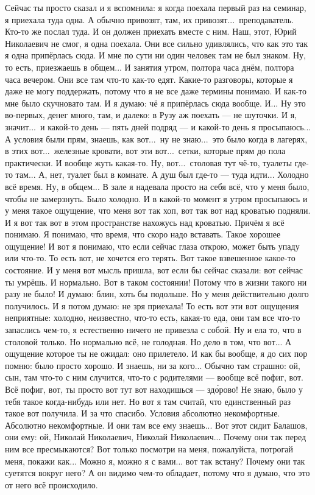 \M
Сейчас ты просто сказал и я вспомнила: я когда поехала первый раз на семинар,
я приехала туда одна. А обычно привозят, там, их привозят...\
преподаватель. Кто-то же послал туда. И он должен приехать вместе с ним. Наш, этот,
Юрий Николаевич не смог, я одна поехала. Они все сильно удивлялись, что как это
так я одна припёрлась сюда.
И мне по сути ни один человек там не был знаком. Ну, то есть, приезжаешь в общем...
И занятия утром, полтора часа днём, полтора часа вечером. Они все там что-то как-то едят.
Какие-то разговоры, которые я даже не могу поддержать, потому что я не все даже термины понимаю.
И как-то мне было скучновато там. И я думаю: чё я припёрлась сюда вообще. И...
Ну это во-первых, денег много, там, и далеко: в Рузу аж поехать --- не шуточки.
И я, значит...\ и какой-то день --- пять дней подряд --- и какой-то день я просыпаюсь...
А условия были прям, знаешь, как вот...\ ну не знаю...\ это было когда в лагерях,
в этих вот...\ железные кровати, вот эти вот...\ сетки, которые прям до пола практически.
И вообще жуть какая-то.
Ну, вот...\ столовая тут чё-то, туалеты где-то там...
А, нет, туалет был в комнате.
А душ был где-то --- туда идти...
Холодно всё время.
Ну, в общем...
В зале я надевала просто на себя всё, что у меня было, чтобы не замерзнуть. Было холодно.
И в какой-то момент я утром просыпаюсь и у меня такое ощущение, что
меня вот так хоп, вот так вот над кроватью подняли.
И я вот так вот в этом пространстве нахожусь над кроватью.
Причём я всё понимаю.
Я понимаю, что время, что скоро надо вставать.
Такое хорошее ощущение!
И вот я понимаю, что если сейчас глаза открою, может быть упаду или что-то.
То есть вот, не хочется его терять.
Вот такое взвешенное
какое-то состояние.
И у меня вот мысль пришла,
вот если бы сейчас сказали: вот сейчас ты умрёшь.
И нормально. Вот в таком состоянии!
Потому что в жизни такого ни разу не было!
И думаю: блин, хоть бы подольше.
Но у меня действительно долго получилось.
И я потом думаю: не зря приехала!
То есть вот эти вот ощущения неприятные:
холодно, неизвестно,
что-то есть, какая-то еда,
они там все что-то запаслись чем-то,
я естественно ничего не привезла с собой.
Ну и ела то, что в столовой только.
Но нормально всё, не голодная.
Но дело в том, что вот...
А ощущение которое ты не ожидал: оно прилетело.
И как бы вообще, я до сих пор помню: было просто хорошо.
И знаешь, ни за кого...
Обычно там страшно: ой, сын, там что-то с ним случится, что-то с родителями --- вообще всё пофиг,
вот.
Всё пофиг, вот, ты просто вот тут вот находишься --- зд\'орово!
Не знаю, было у тебя такое когда-нибудь или нет.
Но вот я там считай, что единственный раз такое вот получила.
И за что спасибо.
Условия абсолютно некомфортные.
Абсолютно некомфортные.
И они там все ему знаешь... Вот этот сидит Балашов, они ему: ой, Николай Николаевич,
Николай Николаевич...
Почему они так перед ним все пресмыкаются?
Вот только посмотри на меня, пожалуйста, потрогай меня, покажи как...
Можно я, можно я с вами... вот так встану?
Почему они так суетятся вокруг него?
А он видимо чем-то обладает, потому что я думаю, что
это от него всё происходило.

